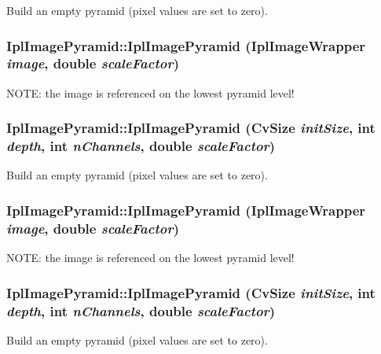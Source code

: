 \label{class_ipl_image_pyramid_a817d4a60ac96b844a97df0fa1bc52a5e}
Build an empty pyramid (pixel values are set to zero). \hypertarget{class_ipl_image_pyramid_a6d41d348cdfaea6e4444b1fdd523f555}{
\subsubsection[{IplImagePyramid}]{\setlength{\rightskip}{0pt plus 5cm}IplImagePyramid::IplImagePyramid ({\bf IplImageWrapper} {\em image}, \/  double {\em scaleFactor})}}
\label{class_ipl_image_pyramid_a6d41d348cdfaea6e4444b1fdd523f555}
NOTE: the image is referenced on the lowest pyramid level! \hypertarget{class_ipl_image_pyramid_a817d4a60ac96b844a97df0fa1bc52a5e}{
\subsubsection[{IplImagePyramid}]{\setlength{\rightskip}{0pt plus 5cm}IplImagePyramid::IplImagePyramid (CvSize {\em initSize}, \/  int {\em depth}, \/  int {\em nChannels}, \/  double {\em scaleFactor})}}
\label{class_ipl_image_pyramid_a817d4a60ac96b844a97df0fa1bc52a5e}
Build an empty pyramid (pixel values are set to zero). \hypertarget{class_ipl_image_pyramid_a6d41d348cdfaea6e4444b1fdd523f555}{
\subsubsection[{IplImagePyramid}]{\setlength{\rightskip}{0pt plus 5cm}IplImagePyramid::IplImagePyramid ({\bf IplImageWrapper} {\em image}, \/  double {\em scaleFactor})}}
\label{class_ipl_image_pyramid_a6d41d348cdfaea6e4444b1fdd523f555}
NOTE: the image is referenced on the lowest pyramid level! \hypertarget{class_ipl_image_pyramid_a817d4a60ac96b844a97df0fa1bc52a5e}{
\subsubsection[{IplImagePyramid}]{\setlength{\rightskip}{0pt plus 5cm}IplImagePyramid::IplImagePyramid (CvSize {\em initSize}, \/  int {\em depth}, \/  int {\em nChannels}, \/  double {\em scaleFactor})}}
\label{class_ipl_image_pyramid_a817d4a60ac96b844a97df0fa1bc52a5e}
Build an empty pyramid (pixel values are set to zero). 

